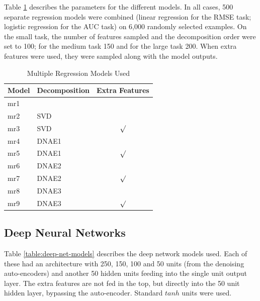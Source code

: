 \documentclass{article}
\begin{document}
Table \ref{table:multiple-regression-models} describes the parameters for the different models.  In all cases, 500 separate regression models were combined (linear regression for the RMSE task; logistic regression for the AUC task) on 6,000 randomly selected examples.  On the small task, the number of features sampled and the decomposition order were set to 100; for the medium task 150 and for the large task 200.  When extra features were used, they were sampled along with the model outputs.

\begin{table}
\caption{Multiple Regression Models Used}
\label{table:multiple-regression-models}
\vskip 0.15in
\begin{center}
\begin{small}
\begin{sc}
\begin{tabular}{llc}
\hline
\abovespace\belowspace
Model & Decomposition & Extra Features \\
\hline
\abovespace
mr1   &        &         \\
mr2   & SVD    &         \\
mr3   & SVD    & $\surd$ \\
mr4   & DNAE1  &         \\
mr5   & DNAE1  & $\surd$ \\
mr6   & DNAE2  &         \\
mr7   & DNAE2  & $\surd$ \\
mr8   & DNAE3  &         \\
\belowspace
mr9   & DNAE3  & $\surd$ \\
\hline
\end{tabular}
\end{sc}
\end{small}
\end{center}
\vskip -0.1in
\end{table}


\subsection{Deep Neural Networks}

Table \ref{table:deep-net-models} describes the deep network models used.  Each of these had an architecture with 250, 150, 100 and 50 units (from the denoising auto-encoders) and another 50 hidden units feeding into the single unit output layer.  The extra features are not fed in the top, but directly into the 50 unit hidden layer, bypassing the auto-encoder.  Standard $tanh$ units were used.
\end{document}
